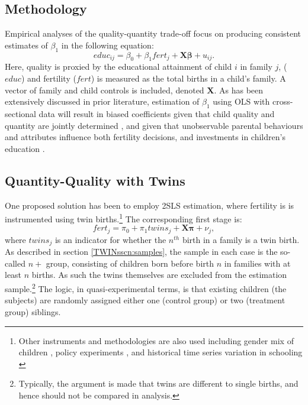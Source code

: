 \documentclass[subeqn]{article}
\begin{document}
\begin{spacing}{1.4}
\section{Methodology}                              \label{TWINscn:method}
Empirical analyses of the quality-quantity trade-off focus on producing 
consistent estimates of $\beta_1$ in the following equation:
\begin{equation}
\label{TWINeqn:RF}
educ_{ij}=\beta_0+\beta_1 fert_{j} + \bm{X}\bm{\beta}+u_{ij}.
\end{equation}
Here, quality is proxied by the educational attainment of child $i$ in family 
$j$, ($educ$) and fertility ($fert$) is measured as the total births in a child's
family.  A vector of family and child controls is included, denoted $\bm{X}$.  As
has been extensively discussed in prior literature, estimation of $\beta_1$ using
OLS with cross-sectional data will result in biased coefficients given that child 
quality and quantity are jointly determined \citep{BeckerLewis1973,
BeckerTomes1976}, and given that unobservable parental behaviours and attributes 
influence both fertility decisions, and investments in children's education 
\citep{Qian2009}.

\subsection{Quantity-Quality with Twins}           \label{TWINsscn:methodQQ}
One proposed solution has been to employ 2SLS estimation, where fertility is 
is instrumented using twin births.\footnote{Other instruments and methodologies 
are also used including gender mix of children \citep{Angristetal2010}, policy 
experiments \citep{Qian2009}, and historical time series variation in schooling 
\citep{BleakleyLange2009}}  The corresponding first stage is:
\begin{equation}
\label{TWINeqn:firststage}
fert_{j}=\pi_0+\pi_1 twins_{j}+\bm{X}\bm{\pi}+\nu_{j},
\end{equation}
where $twins_j$ is an indicator for whether the $n^{th}$ birth in a family is a 
twin birth. As described in section \ref{TWINsscn:samples}, the sample in each 
case is the so-called $n+$ group, consisting of children born before birth $n$ 
in families with at least $n$ births.  As such the twins themselves are excluded 
from the estimation sample.\footnote{Typically, the argument is made that twins 
are different to single births, and hence should not be compared in analysis.}
The logic, in quasi-experimental terms, is that existing children (the subjects) 
are randomly assigned either one (control group) or two (treatment group) 
siblings.


\end{spacing}
\end{document}
